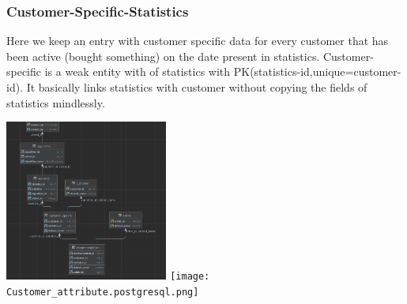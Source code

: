 \documentclass[a4paper,12pt]{article}
\begin{document}
\subsubsection{Customer-Specific-Statistics}
	Here we keep an entry with customer specific data for every customer that has been active (bought something) on the date present in statistics. Customer-specific is a weak entity with of statistics with PK(statistics-id,unique=customer-id). It basically links statistics with customer without copying the fields of statistics mindlessly.
		\begin{center}
		\includegraphics[height={200px},width=\textwidth,keepaspectratio]{Customer-Specific.png}
		\texttt{[image: Customer\_attribute.postgresql.png]}
\end{center}		
	
\end{document}
